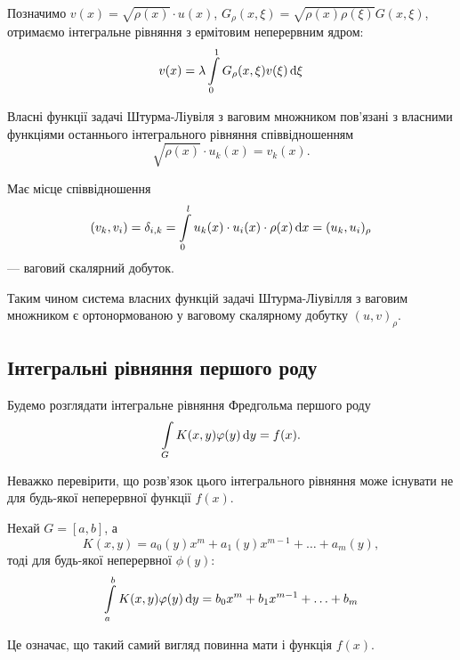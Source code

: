 Позначимо $v(x) = \sqrt{\rho(x)} \cdot u(x)$, $G_\rho(x, \xi) = \sqrt{\rho(x)\rho(\xi)} G(x, \xi)$, отримаємо інтегральне рівняння з ермітовим неперервним ядром:
\begin{equation}
	v(x) = \lambda \displaystyle\int\limits_0^1 G_\rho(x, \xi) v(\xi) \mathop{}\!\mathrm{d} \xi
\end{equation}

Власні функції задачі Штурма-Ліувіля з ваговим множником пов'язані з власними функціями останнього інтегрального рівняння співвідношенням
\begin{equation}
	\sqrt{\rho(x)} \cdot u_k(x) = v_k(x).
\end{equation}

\begin{proposition}
	Має місце співвідношення 
	\begin{equation}
		(v_k, v_i) = \delta_{i,k} = \displaystyle\int\limits_0^l u_k(x) \cdot u_i(x) \cdot \rho(x) \mathop{}\!\mathrm{d} x = (u_k, u_i)_\rho
	\end{equation}
	--- ваговий скалярний добуток.
\end{proposition}

Таким чином система власних функцій задачі Штурма-Ліувілля з ваговим множником є ортонормованою у ваговому скалярному добутку $(u, v)_\rho$.

\subsection{Інтегральні рівняння першого роду}

Будемо розглядати інтегральне рівняння Фредгольма першого роду
\begin{equation}
	\displaystyle\int\limits_G K(x, y) \varphi(y) \mathop{}\!\mathrm{d} y = f(x).
\end{equation}

Неважко перевірити, що розв'язок цього інтегрального рівняння може існувати не для будь-якої неперервної функції $f(x)$. 

\begin{example}
	Нехай $G=[a,b]$, а
	\begin{equation}
		K(x, y)=a_0(y)x^m+a_1(y)x^{m-1}+\ldots+a_m(y),
	\end{equation}
	тоді для будь-якої неперервної $\phi(y)$:
	\begin{equation}
		\displaystyle\int\limits_a^b K(x, y) \varphi(y) \mathop{}\!\mathrm{d} y = b_0x^m + b_1x^{m-1}+\ldots+b_m
	\end{equation}
	 
	Це означає, що такий самий вигляд повинна мати і функція $f(x)$.
\end{example}

